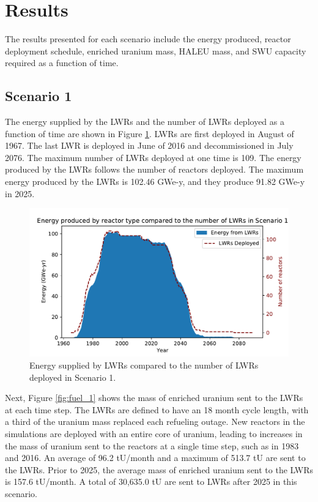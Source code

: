 \section{Results}
The results presented for each scenario include the energy produced, reactor 
deployment schedule, enriched
uranium mass, \gls{HALEU} mass, and \gls{SWU} capacity required as a function 
of time. 

\subsection{Scenario 1}
The energy supplied by the \glspl{LWR} and the number of \glspl{LWR}
deployed as a function of time are shown in Figure \ref{fig:energy_rx_1}. 
\glspl{LWR} are first deployed in August of 1967. The last 
\gls{LWR} is deployed in June of 2016 and decommissioned in July 2076. The 
maximum number of 
\glspl{LWR} deployed at one time is 109. The energy produced by the 
\glspl{LWR} follows the number of reactors deployed. The maximum energy 
produced by the \glspl{LWR} is 102.46 GWe-y, and they produce 91.82 GWe-y 
in 2025.

\begin{figure}
    \centering 
    \includegraphics[width=\textwidth]{../figures/energy_scenario1.pdf}
    \caption{Energy supplied by \glspl{LWR} compared to the number of 
    \glspl{LWR} deployed in Scenario 1.}
    \label{fig:energy_rx_1}
\end{figure}

Next, Figure \ref{fig:fuel_1} shows the mass of enriched uranium sent to 
the \glspl{LWR} at each time step. The \glspl{LWR} are 
defined to have an 18 month cycle length, with a third of the uranium 
mass replaced each refueling outage. New reactors in the simulations 
are deployed with an entire core of uranium, leading 
to increases in the mass of uranium sent to the reactors at a single time 
step, such 
as in 1983 and 2016. An average of 96.2 tU/month and a maximum of 513.7 tU 
are sent to the \glspl{LWR}. Prior to 2025, the average mass
of enriched uranium sent to the \glspl{LWR} is 157.6 tU/month. A total 
of 30,635.0 tU are sent to \glspl{LWR} after 2025 in this scenario. 

